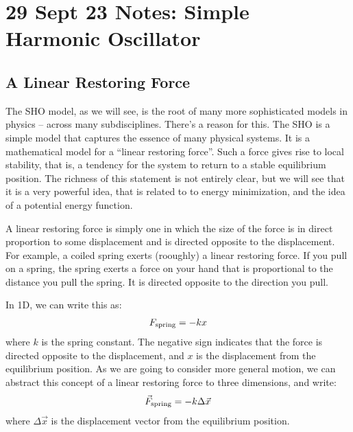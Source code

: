 \documentclass[letterpaper,10pt,english]{jupyterBook}
\begin{document}
\chapter{29 Sept 23 \sphinxhyphen{} Notes: Simple Harmonic Oscillator}
\label{\detokenize{content/1_mechanics/sho/notes-SHO:sept-23-notes-simple-harmonic-oscillator}}\label{\detokenize{content/1_mechanics/sho/notes-SHO::doc}}

\section{A Linear Restoring Force}
\label{\detokenize{content/1_mechanics/sho/notes-SHO:a-linear-restoring-force}}
\sphinxAtStartPar
The SHO model, as we will see, is the root of many more sophisticated models in physics – across many subdisciplines. There’s a reason for this. The SHO is a simple model that captures the essence of many physical systems. It is a mathematical model for a “linear restoring force”. Such a force gives rise to local stability, that is, a tendency for the system to return to a stable equilibrium position. The richness of this statement is not entirely clear, but we will see that it is a very powerful idea, that is related to to energy minimization, and the idea of a potential energy function.

\sphinxAtStartPar
A linear restoring force is simply one in which the size of the force is in direct proportion to some displacement and is directed opposite to the displacement. For example, a coiled spring exerts (rooughly) a linear restoring force. If you pull on a spring, the spring exerts a force on your hand that is proportional to the distance you pull the spring. It is directed opposite to the direction you pull.

\sphinxAtStartPar
In 1D, we can write this as:
\begin{equation*}
\begin{split}F_{\rm spring} = -kx\end{split}
\end{equation*}
\sphinxAtStartPar
where \(k\) is the spring constant. The negative sign indicates that the force is directed opposite to the displacement, and \(x\) is the displacement from the equilibrium position. As we are going to consider more general motion, we can abstract this concept of a linear restoring force to three dimensions, and write:
\begin{equation*}
\begin{split}\vec{F}_{\rm spring} = -k \Delta \vec{x}\end{split}
\end{equation*}
\sphinxAtStartPar
where \(\Delta \vec{x}\) is the displacement vector from the equilibrium position.
\end{document}

